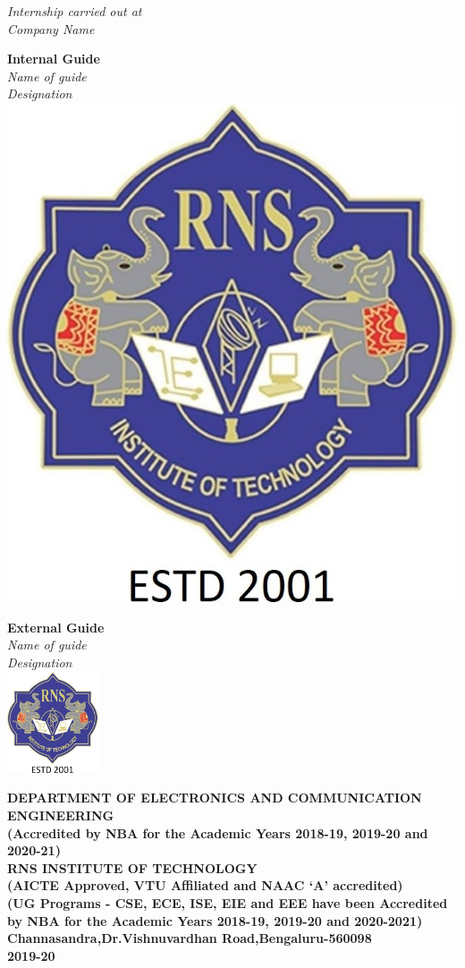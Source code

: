 \begin{titlingpage}
\begin{center}
		\textit{\color{white}Internship carried out at}\\
		
		\textit{\color{white}Company Name}\\
	\end{center}
	\vspace{0.3cm}
	
	\begin{minipage}[t]{0.3\textwidth}%
		\Large\textbf{\color{white}Internal Guide}\\
		\centering\large\textit{\color{white}Name of guide}\\
		\centering\large\textit{\color{white}Designation}\\
		
		\centering\includegraphics[height=3 cm]{images/rns1.jpg}
	\end{minipage}\hspace{6cm}
	\begin{minipage}[t]{0.3\textwidth}%
		\Large\textbf{\color{white}External Guide}\\
		\centering\large\textit{\color{white}Name of guide}\\
		\centering\large\textit{\color{white}Designation}\\
		
		\centering\includegraphics[height=3cm]{images/rns1.jpg}\\
	\end{minipage}
	
	
	
	\begin{center}
		\vspace{0.5cm}
		\scriptsize\textbf{\color{white}DEPARTMENT OF ELECTRONICS AND COMMUNICATION ENGINEERING\\
			\small(Accredited by NBA for the Academic Years 2018-19, 2019-20 and 2020-21)}\\
		\vspace{0.5cm}
		\small\textbf{\color{white}RNS INSTITUTE OF TECHNOLOGY\\
			(AICTE Approved, VTU Affiliated and NAAC `A' accredited)\\
			(UG Programs - CSE, ECE, ISE, EIE and EEE have been Accredited by NBA for the Academic Years 2018-19, 2019-20 and 2020-2021)\\
			Channasandra,Dr.Vishnuvardhan Road,Bengaluru-560098\\
			\vspace{0.5cm}
			2019-20}
	\end{center}
\end{titlingpage}
